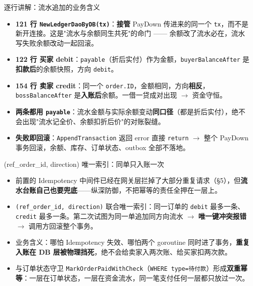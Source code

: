 \documentclass[aspectratio=169,11pt]{beamer}
\begin{document}
\begin{frame}[shrink]{逐行讲解：流水追加的业务含义}
\begin{itemize}\small
  \item \textbf{121 行 \texttt{NewLedgerDaoByDB(tx)}}：\textbf{接管} PayDown 传进来的同一个 \texttt{tx}，而不是新开连接。这是"流水与余额同生共死"的命门 —— 余额改了流水必在，流水写失败余额改动一起回滚。
  \item \textbf{122 行 买家 debit}：\texttt{payable}（折后实付）作为金额，\texttt{buyerBalanceAfter} 是\textbf{扣款后}的余额快照，方向 \texttt{debit}。
  \item \textbf{154 行 卖家 credit}：同一个 \texttt{order.ID}，金额相同，方向\textbf{相反}，\texttt{bossBalanceAfter} 是\textbf{入账后}余额。一借一贷成对出现 $\to$ 资金守恒。
  \item \textbf{两条都用 \texttt{payable}}：流水金额与实际余额变动\textbf{同口径}（都是折后实付），绝不会出现"流水记全价、余额扣折后价"的对账裂缝。
  \item \textbf{失败即回滚}：\texttt{AppendTransaction} 返回 error 直接 \texttt{return} $\to$ 整个 PayDown 事务回滚，余额、库存、订单状态、outbox 全部不落地。
\end{itemize}
\end{frame}

\begin{frame}[shrink]{(ref\_order\_id, direction) 唯一索引：同单只入账一次}
\begin{itemize}\small
  \item 前置的 Idempotency 中间件已经在网关层拦掉了大部分重复请求（§5），但\textbf{流水台账自己也要兜底}——纵深防御，不把幂等的责任全押在一层上。
  \item \texttt{(ref\_order\_id, direction)} 联合唯一索引：同一订单的 \texttt{debit} 最多一条、\texttt{credit} 最多一条。第二次试图为同一单追加同方向流水 $\to$ \textbf{唯一键冲突报错} $\to$ 调用方回滚整个事务。
  \item 业务含义：哪怕 Idempotency 失效、哪怕两个 goroutine 同时进了事务，\textbf{重复入账在 DB 层被物理挡死}，绝不会给卖家入两次账、给买家扣两次款。
  \item 与订单状态守卫 \texttt{MarkOrderPaidWithCheck}（\texttt{WHERE type=待付款}）形成\textbf{双重幂等}：一层在订单状态，一层在资金流水，同一笔支付任何一层都只放过一次。
\end{itemize}
\end{frame}
\end{document}
